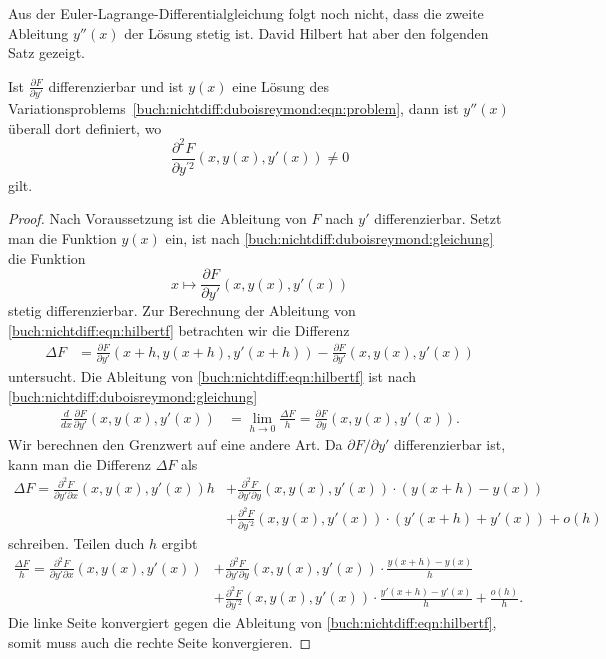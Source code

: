 Aus der Euler-Lagrange-Differentialgleichung folgt noch nicht, dass
die zweite Ableitung $y''(x)$ der Lösung stetig ist.
David Hilbert hat aber den folgenden Satz gezeigt.

\begin{satz}
Ist $\frac{\partial F}{\partial y'}$ differenzierbar und ist $y(x)$ eine
Lösung des Variationsproblems~\eqref{buch:nichtdiff:duboisreymond:eqn:problem},
dann ist $y''(x)$ überall dort definiert, wo
\begin{equation}
\frac{\partial^2 F}{\partial y^{\prime 2}}(x,y(x),y'(x)) \ne 0
\label{buch:nichtdiff:duboysreymond:eqn:positiv}
\end{equation}
gilt.
\end{satz}

\begin{proof}
Nach Voraussetzung ist die Ableitung von $F$ nach $y'$ differenzierbar.
Setzt man die Funktion $y(x)$ ein, ist nach 
\eqref{buch:nichtdiff:duboisreymond:gleichung}
die Funktion
\begin{equation}
x\mapsto
\frac{\partial F}{\partial y'}(x,y(x),y'(x))
\label{buch:nichtdiff:eqn:hilbertf}
\end{equation}
stetig differenzierbar.
Zur Berechnung der Ableitung von \eqref{buch:nichtdiff:eqn:hilbertf}
betrachten wir die Differenz
\begin{align*}
\Delta F
&=
\frac{\partial F}{\partial y'}(x+h,y(x+h),y'(x+h))
-
\frac{\partial F}{\partial y'}(x,y(x),y'(x))
\end{align*}
untersucht.
Die Ableitung von \eqref{buch:nichtdiff:eqn:hilbertf} ist
nach \eqref{buch:nichtdiff:duboisreymond:gleichung}
\begin{align*}
\frac{d}{dx}
\frac{\partial F}{\partial y'}(x,y(x),y'(x))
&=
\lim_{h\to 0}
\frac{\Delta F}{h}
=
\frac{\partial F}{\partial y}(x,y(x),y'(x)).
\end{align*}
Wir berechnen den Grenzwert auf eine andere Art.
Da $\partial F/\partial y'$ differenzierbar ist, kann man die Differenz
$\Delta F$ als
\begin{align*}
\Delta F
=
\frac{\partial^2 F}{\partial y'\partial x}(x,y(x),y'(x)) h
&+
\frac{\partial^2 F}{\partial y'\partial y}(x,y(x),y'(x)) \cdot (y(x+h)-y(x))
\\
&+
\frac{\partial^2 F}{\partial y^{\prime 2}}(x,y(x),y'(x)) \cdot (y'(x+h)+y'(x))
+
o(h)
\end{align*}
schreiben.
Teilen duch $h$ ergibt
\begin{align}
\frac{\Delta F}{h}
=
\frac{\partial^2 F}{\partial y'\partial x}(x,y(x),y'(x))
&+
\frac{\partial^2 F}{\partial y'\partial y}(x,y(x),y'(x))
\cdot
\frac{y(x+h)-y(x)}{h}
\label{buch:nichtdiff:eqn:hilbertlim1}
\\
&+
\frac{\partial^2 F}{\partial y^{\prime 2}}(x,y(x),y'(x))
\cdot
\frac{y'(x+h)-y'(x)}{h}
+
\frac{o(h)}{h}.
\label{buch:nichtdiff:eqn:hilbertlim2}
\end{align}
Die linke Seite konvergiert gegen die Ableitung von
\eqref{buch:nichtdiff:eqn:hilbertf}, somit muss auch die rechte Seite
konvergieren.


\end{proof}
